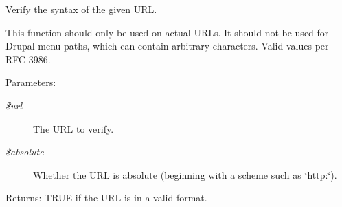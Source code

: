 Verify the syntax of the given URL.

This function should only be used on actual URLs. It should not be used for Drupal menu paths, which can contain arbitrary characters. Valid values per RFC 3986.

\begin{Desc}
\item[Parameters:]
\begin{description}
\item[{\em \$url}]The URL to verify. \item[{\em \$absolute}]Whether the URL is absolute (beginning with a scheme such as \char`\"{}http:\char`\"{}). \end{description}
\end{Desc}
\begin{Desc}
\item[Returns:]TRUE if the URL is in a valid format. \end{Desc}
